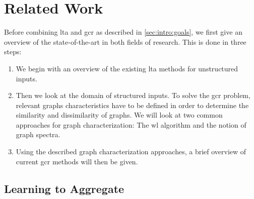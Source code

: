 \chapter{Related Work}%
\label{sec:related}

Before combining \ac{lta} and \ac{gcr} as described in \cref{sec:intro:goals}, we first give an overview of the state-of-the-art in both fields of research.
This is done in three steps:
\begin{enumerate}
	\item We begin with an overview of the existing \ac{lta} methods for unstructured inputs.
	\item Then we look at the domain of structured inputs.
		To solve the \ac{gcr} problem, relevant graphs characteristics have to be defined in order to determine the similarity and dissimilarity of graphs.
		We will look at two common approaches for graph characterization: The \acl{wl} algorithm and the notion of graph spectra.
	\item Using the described graph characterization approaches, a brief overview of current \ac{gcr} methods will then be given.
\end{enumerate}

\section{Learning to Aggregate}%
\label{sec:related:lta}

